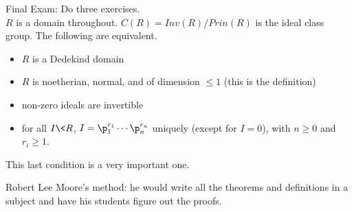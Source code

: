  Final Exam: Do three exercises. \\
 $R$ is a domain throughout. $C(R)=Inv(R)/Prin(R)$ is the ideal class group. The
 following are equivalent.
 \begin{itemize}
   \item $R$ is a Dedekind domain
   \item $R$ is noetherian, normal, and of dimension $\le 1$ (this is the definition)
   \item non-zero ideals are invertible
   \item for all $I\< R$, $I=\p_1^{r_1}\cdots \p_n^{r_n}$ uniquely (except for $I=0$),
   with $n\ge 0$ and $r_i\ge 1$.
 \end{itemize}
 This last condition is a very important one.

 Robert Lee Moore's method: he would write all the theorems and definitions in a subject and
 have his students figure out the proofs.

